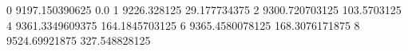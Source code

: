 0 9197.150390625 0.0
1 9226.328125 29.177734375
2 9300.720703125 103.5703125
4 9361.3349609375 164.1845703125
6 9365.4580078125 168.3076171875
8 9524.69921875 327.548828125
